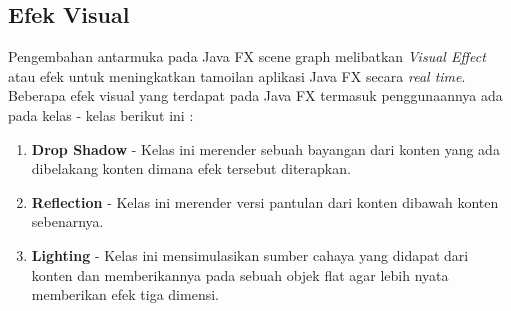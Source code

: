 \subsection{Efek Visual}
Pengembahan antarmuka pada Java FX scene graph melibatkan \textit{Visual Effect} atau efek untuk meningkatkan tamoilan aplikasi Java FX secara \textit{real time}. Beberapa efek visual yang terdapat pada Java FX termasuk penggunaannya ada pada kelas - kelas berikut ini :\cite{javafx}
\begin{enumerate}
	\item \textbf{Drop Shadow} - Kelas ini merender sebuah bayangan dari konten yang ada dibelakang konten dimana efek tersebut diterapkan.
	\item \textbf{Reflection} - Kelas ini merender versi pantulan dari konten dibawah konten sebenarnya.
	\item \textbf{Lighting} - Kelas ini mensimulasikan sumber cahaya yang didapat dari konten dan memberikannya pada sebuah objek flat agar lebih nyata memberikan efek tiga dimensi.
\end{enumerate}

